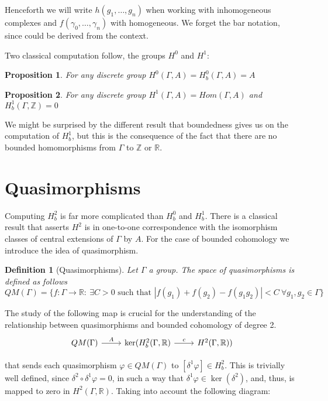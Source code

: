 \documentclass[leqno]{article}
\newtheorem*{proposition}{Proposition}
\newtheorem*{definition}{Definition}
\begin{document}
Henceforth we will write $h(g_1, \ldots, g_n)$ when working with inhomogeneous complexes and $f(\gamma_0, \ldots, \gamma_n)$ with homogeneous. We forget the bar notation, since could be derived from the context.

Two classical computation follow, the groups $H^0$ and  $H^1$:

\begin{proposition}
For any discrete group $H^0(\Gamma , A) = H^0_{b} (\Gamma , A) = A$
\end{proposition}

\begin{proposition}
For any discrete group $H^1(\Gamma , A) = Hom(\Gamma , A)$  and  $H^1_{b} (\Gamma , \mathbb{Z}) = 0$
\end{proposition}

We might be surprised by the different result that boundedness gives us on the computation of $H^1_{b}$, but this is the consequence of the fact that there are no bounded homomorphisms from $\Gamma $ to $\mathbb{Z}$ or $\mathbb{R}$.

\section{Quasimorphisms}
Computing $H^2_b$ is far more complicated than  $H^0_b$ and  $H^1_b$. There is a classical result that asserts  $H^2$ is in one-to-one correspondence with the isomorphism classes of central extensions of $\Gamma $ by $A$. For the case of bounded cohomology we introduce the idea of quasimorphism.

 \begin{definition}[Quasimorphisms] Let $\Gamma $ a group. The space of quasimorphisms is defined as follows
   \[
	 QM(\Gamma ) = \{f:\Gamma \to \mathbb{R}: \ \exists C>0 \text{ such that } |f(g_1)+f(g_2)-f(g_1g_2)|<C \ \forall g_1, g_2\in \Gamma  \}   
   \] 
\end{definition}

The study of the following map is crucial for the understanding of the relationship between quasimorphisms and bounded cohomology of degree 2.
\[\begin{tikzcd}
	{QM(\Gamma)} & {\ker(H_b^2(\Gamma, \mathbb{R})} & {H^2(\Gamma, \mathbb{R}))} 
	\arrow["c", from=1-2, to=1-3]
	\arrow["A", from=1-1, to=1-2]
\end{tikzcd}\]

that sends each quasimorphism $\varphi \in QM(\Gamma )$ to $[\delta^1\varphi ]\in H_b^2$. This is trivially well defined, since $\delta^2\circ \delta^1 \varphi =0$, in such a way that $\delta^1 \varphi  \in \ker(\delta^2)$, and, thus, is mapped to zero in $H^2(\Gamma, \mathbb{R})$. Taking into account the following diagram:
\end{document}
